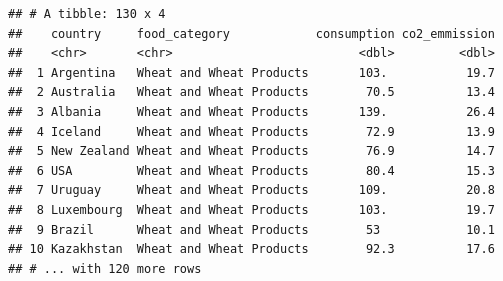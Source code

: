 \documentclass[ignorenonframetext,]{beamer}
\newenvironment{Shaded}{\begin{snugshade}}{\end{snugshade}}
\newcommand{\KeywordTok}[1]{\textcolor[rgb]{0.13,0.29,0.53}{\textbf{#1}}}
\newcommand{\NormalTok}[1]{#1}
\newcommand{\OperatorTok}[1]{\textcolor[rgb]{0.81,0.36,0.00}{\textbf{#1}}}
\newcommand{\StringTok}[1]{\textcolor[rgb]{0.31,0.60,0.02}{#1}}
\begin{document}
\begin{frame}[fragile]{}
\protect\hypertarget{section-17}{}

\vspace{1ex}\scriptsize

\begin{Shaded}
\end{Shaded}

\begin{verbatim}
## # A tibble: 130 x 4
##    country     food_category            consumption co2_emmission
##    <chr>       <chr>                          <dbl>         <dbl>
##  1 Argentina   Wheat and Wheat Products       103.           19.7
##  2 Australia   Wheat and Wheat Products        70.5          13.4
##  3 Albania     Wheat and Wheat Products       139.           26.4
##  4 Iceland     Wheat and Wheat Products        72.9          13.9
##  5 New Zealand Wheat and Wheat Products        76.9          14.7
##  6 USA         Wheat and Wheat Products        80.4          15.3
##  7 Uruguay     Wheat and Wheat Products       109.           20.8
##  8 Luxembourg  Wheat and Wheat Products       103.           19.7
##  9 Brazil      Wheat and Wheat Products        53            10.1
## 10 Kazakhstan  Wheat and Wheat Products        92.3          17.6
## # ... with 120 more rows
\end{verbatim}

\end{frame}
\end{document}
